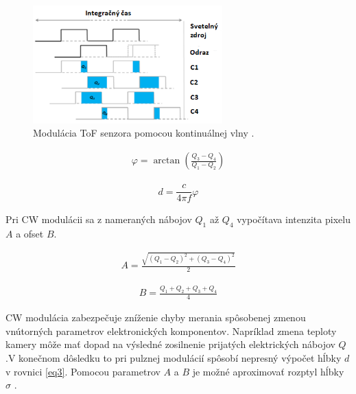 \begin{figure}[H]
	\centering
	\includegraphics[width=0.65\textwidth]{figures/tof_principle_b.png} 
	\caption{Modulácia ToF senzora pomocou kontinuálnej vlny \cite{li2014time}.}
	\label{fig:tof_principle_b}
\end{figure}

\begin{equation}
\label{eq4}
\begin{aligned}
\varphi=\arctan \left( \frac{Q_3 - Q_4}{Q_1-Q_2} \right) 
\end{aligned}
\end{equation}

\begin{equation}
\label{eq:cw:depth}
\begin{aligned}
d=\dfrac{c}{4\pi f}\varphi 
\end{aligned}
\end{equation}

Pri CW modulácii sa z nameraných nábojov $Q_1$ až $Q_4$ vypočítava intenzita pixelu $A$ a ofset $B$. 

\begin{equation}
\label{eq5}
\begin{aligned}
A=\frac{\sqrt{\left(Q_1 - Q_2\right)^2 + \left(Q_3 - Q_4\right)^2 }} {2} 
\end{aligned}
\end{equation}

\begin{equation}
\label{eq6}
\begin{aligned}
B=\frac{Q_1 + Q_2 +Q_3 + Q_4}{4} 
\end{aligned}
\end{equation}

CW modulácia zabezpečuje zníženie chyby merania spôsobenej zmenou vnútorných parametrov elektronických komponentov. Napríklad zmena teploty kamery môže mať dopad na výsledné zosilnenie prijatých elektrických nábojov $Q$.V konečnom dôsledku to pri pulznej modulácií spôsobí nepresný výpočet hĺbky $d$ v rovnici \ref{eq3}. Pomocou parametrov $A$ a $B$ je možné aproximovať rozptyl hĺbky $\sigma$ \cite{li2014time}.

